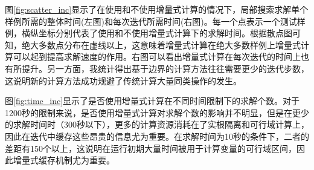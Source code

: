 图\ref{fig:scatter_inc}显示了在使用和不使用增量式计算的情况下，局部搜索求解单个样例所需的整体时间(左图)和每次迭代所需时间(右图)。每一个点表示一个测试样例，横纵坐标分别代表了使用和不使用增量式计算下的求解时间。根据散点图可知，绝大多数点分布在虚线以上，这意味着增量式计算在绝大多数样例上增量式计算可以起到提高求解速度的作用。右图可以看出增量式计算在每次迭代的时间上也有所提升。另一方面，我统计得出基于边界的计算方法往往需要更少的迭代步数，这说明新的计算方法成功规避了传统计算大量同类操作的发生。


图\ref{fig:time_inc}显示了是否使用增量式计算在不同时间限制下的求解个数。对于1200秒的限制来说，是否使用增量式计算对求解个数的影响并不明显，但是在更少的求解时间时（300秒以下），更多的计算资源消耗在了实根隔离和可行域计算上，因此在迭代中缓存这些昂贵的信息尤为重要。在求解时间为10秒的条件下，二者的差距有150个以上，这说明在运行初期大量时间被用于计算变量的可行域区间，因此增量式缓存机制尤为重要。

